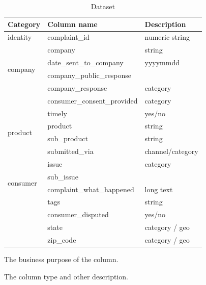 \documentclass[conference]{IEEEtran}
\begin{document}
\begin{table}[h]
\caption{Dataset}
\begin{threeparttable}
\begin{tabular}{p{1.2cm}|p{4cm}|p{2.3cm}}
\hline
\hline
Category\tnote{1} & Column name & Description\tnote{2} \\ \hline
identity & complaint\_id & numeric string  \\ \hline

\multirow{4}{*}{company} & company & string \\ \cline{2-3} 
						 & date\_sent\_to\_company & yyyy\-mm\-dd \\ \cline{2-3}
                         & company\_public\_response &  \\ \cline{2-3} 
                         & company\_response & category \\ \cline{2-3} 
                         & consumer\_consent\_provided & category  \\ \cline{2-3} 
                         & timely   & yes/no \\ \hline
\multirow{2}{*}{product} & product & string \\ \cline{2-3}
 						 & sub\_product  & string \\ \hline
\multirow{6}{*}{consumer} 
                       & submitted\_via   & channel/category \\ \cline{2-3}
					   & issue  & category \\ \cline{2-3}
					   & sub\_issue  & \\ \cline{2-3}
					   & complaint\_what\_happened	  & long text \\ \cline{2-3}
					   & tags	  & string \\ \cline{2-3}
                       & consumer\_disputed  & yes/no \\ \cline{2-3}
                       & state   & category / geo  \\ \cline{2-3}
                       & zip\_code & category / geo  \\ \hline                         
\bottomrule
\end{tabular}
\begin{tablenotes}
\footnotesize
\item[1] The business purpose of the column.
\item[2] The column type and other description.

\end{tablenotes}
\end{threeparttable}
\end{table}
\end{document}
